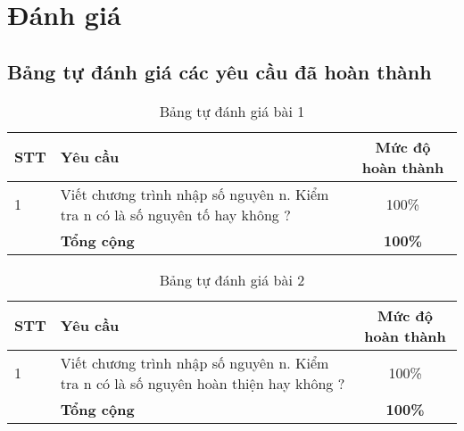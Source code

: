 \section{Đánh giá}
\subsection{Bảng tự đánh giá các yêu cầu đã hoàn thành}

\begin{center}
  \begin{table}[H]
    \centering
    \caption{Bảng tự đánh giá bài 1}
    \renewcommand{\arraystretch}{1.4}
    \begin{tabular}{|l|p{}|c|}
      \hline
      \textbf{STT} & \textbf{Yêu cầu}                                                              & \textbf{Mức độ hoàn thành} \\ \hline
      1            & Viết chương trình nhập số nguyên n. Kiểm tra n có là số nguyên tố hay không ? & 100\%                      \\ \hline
                   & \textbf{Tổng cộng}                                                            & \textbf{100\%}             \\ \hline
    \end{tabular}
    \label{tab:mytable}
  \end{table}

  \begin{table}[H]
    \centering
    \caption{Bảng tự đánh giá bài 2}
    \renewcommand{\arraystretch}{1.4}
    \begin{tabular}{|l|p{}|c|}
      \hline
      \textbf{STT} & \textbf{Yêu cầu}                                                                      & \textbf{Mức độ hoàn thành} \\ \hline
      1            & Viết chương trình nhập số nguyên n. Kiểm tra n có là số nguyên hoàn thiện hay không ? & 100\%                      \\ \hline
                   & \textbf{Tổng cộng}                                                                    & \textbf{100\%}             \\ \hline
    \end{tabular}
    \label{tab:mytable}
  \end{table}



\end{center}
